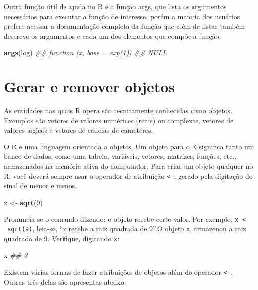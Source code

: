 \documentclass[
  11pt,
  a5paper,
  openany]{book}
\newenvironment{Shaded}{\begin{snugshade}}{\end{snugshade}}
\newcommand{\CommentTok}[1]{\textcolor[rgb]{0.56,0.35,0.01}{\textit{#1}}}
\newcommand{\DecValTok}[1]{\textcolor[rgb]{0.00,0.00,0.81}{#1}}
\newcommand{\KeywordTok}[1]{\textcolor[rgb]{0.13,0.29,0.53}{\textbf{#1}}}
\newcommand{\NormalTok}[1]{#1}
\newcommand{\StringTok}[1]{\textcolor[rgb]{0.31,0.60,0.02}{#1}}
\begin{document}
Outra função útil de ajuda no R é a função args, que lista os argumentos necessários para executar a função de interesse, porém a maioria dos usuários prefere acessar a documentação completa da função que além de listar também descreve os argumentos e cada um dos elementos que compõe a função.

\begin{Shaded}
\begin{Highlighting}[]
\KeywordTok{args}\NormalTok{(log)}
\CommentTok{## function (x, base = exp(1)) }
\CommentTok{##   NULL}
\end{Highlighting}
\end{Shaded}

\hypertarget{gerar-e-remover-objetos}{%
\section{Gerar e remover objetos}\label{gerar-e-remover-objetos}}

As entidades nas quais R opera são tecnicamente conhecidas como objetos. Exemplos são vetores de valores numéricos (reais) ou complexos, vetores de valores lógicos e vetores de cadeias de caracteres.

O R é uma linguagem orientada a objetos. Um objeto para o R significa tanto um banco de dados, como uma tabela, variáveis, vetores, matrizes, funções, etc., armazenados na memória ativa do computador. Para criar um objeto qualquer no R, você deverá sempre usar o operador de atribuição \texttt{\textless{}-}, gerado pela digitação do sinal de menor e menos.

\begin{Shaded}
\begin{Highlighting}[]
\NormalTok{x <-}\StringTok{ }\KeywordTok{sqrt}\NormalTok{(}\DecValTok{9}\NormalTok{)}
\end{Highlighting}
\end{Shaded}

Pronuncia-se o comando dizendo: o objeto recebe certo valor. Por exemplo, \texttt{x\ \textless{}-\ sqrt(9)}, leia-se, ``x recebe a raiz quadrada de 9''.O objeto \texttt{x}, armazenou a raiz quadrada de 9. Verifique, digitando \texttt{x}:

\begin{Shaded}
\begin{Highlighting}[]
\NormalTok{x}
\CommentTok{## 3}
\end{Highlighting}
\end{Shaded}

Existem várias formas de fazer atribuições de objetos além do operador \texttt{\textless{}-}. Outras três delas são apresentas abaixo.
\end{document}
